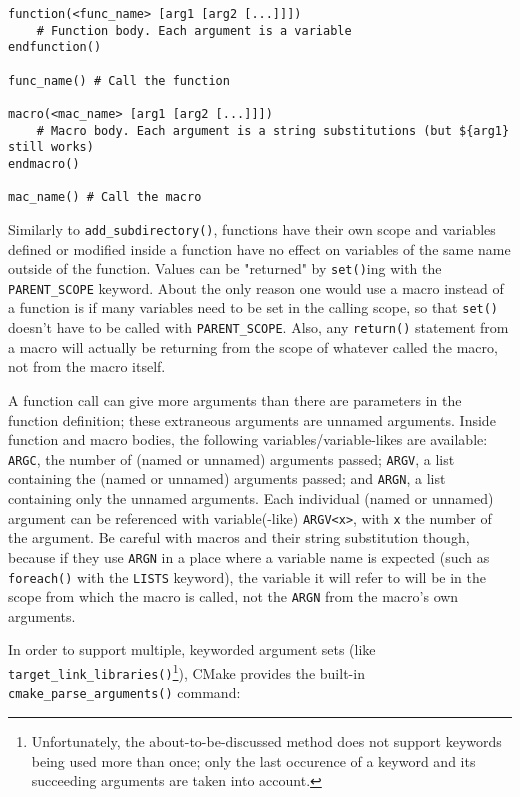 \documentclass[8pt, table, xcdraw]{article}%
\begin{document}
\begin{lstlisting}
function(<func_name> [arg1 [arg2 [...]]])
    # Function body. Each argument is a variable
endfunction()

func_name() # Call the function

macro(<mac_name> [arg1 [arg2 [...]]])
    # Macro body. Each argument is a string substitutions (but ${arg1} still works)
endmacro()

mac_name() # Call the macro
\end{lstlisting}

Similarly to \lstinline{add_subdirectory()}, functions have their own scope and variables defined or modified inside a function have no effect on variables of the same name outside of the function. Values can be "returned" by \lstinline{set()}ing with the \lstinline{PARENT_SCOPE} keyword. About the only reason one would use a macro instead of a function is if many variables need to be set in the calling scope, so that \lstinline{set()} doesn't have to be called with \lstinline{PARENT_SCOPE}. Also, any \lstinline{return()} statement from a macro will actually be returning from the scope of whatever called the macro, not from the
macro itself.

A function call can give more arguments than there are parameters in the function definition; these extraneous arguments are unnamed arguments. Inside function and macro bodies, the following variables/variable-likes are available: \lstinline{ARGC}, the number of (named or unnamed) arguments passed; \lstinline{ARGV}, a list containing the (named or unnamed) arguments passed; and \lstinline{ARGN}, a list containing only the unnamed arguments. Each individual (named or unnamed) argument can be referenced with variable(-like) \lstinline{ARGV<x>}, with \lstinline{x} the number of the argument. Be careful with macros and their string substitution though, because if they use \lstinline{ARGN} in a place where a variable name is expected (such as \lstinline{foreach()} with the \lstinline{LISTS} keyword), the variable it will refer to will be in the scope from which the macro is called, not the \lstinline{ARGN} from the macro’s own arguments.

In order to support multiple, keyworded argument sets (like \lstinline{target_link_libraries()}\footnote{Unfortunately, the about-to-be-discussed method does not support keywords being used more than once; only the last occurence of a keyword and its succeeding arguments are taken into account.}), CMake provides the built-in \lstinline{cmake_parse_arguments()} command:
\end{document}
